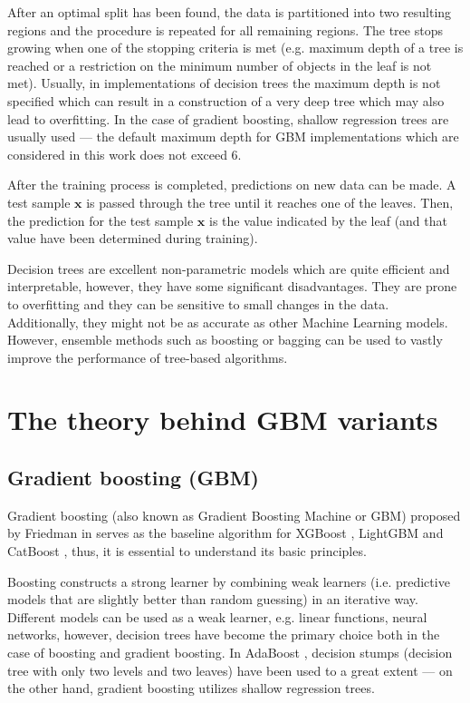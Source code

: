 \documentclass[magisterska, english]{pwr_wmat_praca_dyplomowa}
\theoremstyle{plain}
\numberwithin{theorem}{chapter}
\theoremstyle{definition}
\numberwithin{theorem}{chapter}
\begin{document}
After an optimal split has been found, the data is partitioned into two resulting regions and the procedure is repeated for all remaining regions. The tree stops growing when one of the stopping criteria is met (e.g. maximum depth of a tree is reached or a restriction on the minimum number of objects in the leaf is not met). Usually, in implementations of decision trees the maximum depth is not specified which can result in a construction of a very deep tree which may also lead to overfitting. In the case of gradient boosting, shallow regression trees are usually used --- the default maximum depth for GBM implementations which are considered in this work does not exceed 6.

After the training process is completed, predictions on new data can be made. A test sample $\mathbf{x}$ is passed through the tree until it reaches one of the leaves. Then, the prediction for the test sample $\mathbf{x}$ is the value indicated by the leaf (and that value have been determined during training).

Decision trees are excellent non-parametric models which are quite efficient and interpretable, however, they have some significant disadvantages. They are prone to overfitting and they can be sensitive to small changes in the data. Additionally, they might not be as accurate as other Machine Learning models. However, ensemble methods such as boosting or bagging can be used to vastly improve the performance of tree-based algorithms.

\section{The theory behind GBM variants}
\subsection{Gradient boosting (GBM)}\label{section:gbm}
Gradient boosting (also known as Gradient Boosting Machine or GBM) proposed by Friedman in \cite{friedman_gbm} serves as the baseline algorithm for XGBoost \cite{xgboost}, LightGBM \cite{lightgbm} and CatBoost \cite{catboost}, thus, it is essential to understand its basic principles.

Boosting constructs a strong learner by combining weak learners (i.e. predictive models that are slightly better than random guessing) in an iterative way. Different models can be used as a weak learner, e.g. linear functions, neural networks, however, decision trees have become the primary choice both in the case of boosting and gradient boosting. In AdaBoost \cite{adaboost}, decision stumps (decision tree with only two levels and two leaves) have been used to a great extent --- on the other hand, gradient boosting \cite{friedman_gbm} utilizes shallow regression trees.
\end{document}
